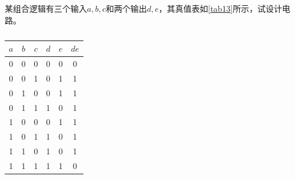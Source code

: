 \begin{example}\label{exa3}
某组合逻辑有三个输入$a,b,c$和两个输出$d,e$，其真值表如\autoref{tab13}所示，试设计电路。
\begin{table}[!ht]
\centering
\begin{tabular}{|ccc|cc|c|}
\hline
$a$&$b$&$c$&$d$&$e$&$de$\\\hline
0&0&0&0&0&0\\\hline
0&0&1&0&1&1\\\hline
0&1&0&0&1&1\\\hline
0&1&1&1&0&1\\\hline
1&0&0&0&1&1\\\hline
1&0&1&1&0&1\\\hline
1&1&0&1&0&1\\\hline
1&1&1&1&1&0\\\hline
\end{tabular}
\caption{}\label{tab13}
\end{table}
\end{example}
